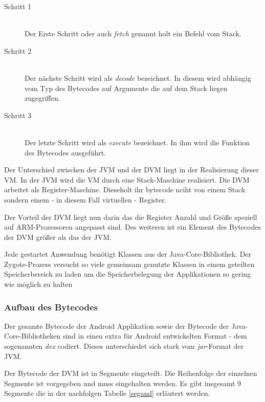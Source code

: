  \begin{description}
 
 \item[Schritt 1] \hfill \\
 
Der Erste Schritt oder auch \textit{fetch} genannt holt ein Befehl vom Stack.
 
 \item[Schritt 2] \hfill \\
Der nächste Schritt wird als \textit{decode} bezeichnet. In diesem wird abhängig vom Typ des Bytecodes auf Argumente die auf dem Stack liegen zugegriffen.
 
 \item[Schritt 3] \hfill \\
 
Der letzte Schritt wird als \textit{execute} bezeichnet. In ihm wird die Funktion des Bytecodes ausgeführt.
 
 \end{description}
 
 Der Unterschied zwischen der JVM und der DVM liegt in der Realisierung dieser VM. In der JVM wird die VM durch eine Stack-Maschine realisiert. Die DVM arbeitet als Register-Maschine. Dieseholt ihr bytecode nciht von einem Stack sondern einem - in diesem Fall virtuellen - Register.
 
 Der Vorteil der DVM liegt nun darin das die Register Anzahl und Größe speziell auf ARM-Prozessoren angepasst sind. Des weiteren ist ein Element des Bytecodes der DVM größer als das der JVM.
 
 Jede gestartet Anwendung benötigt Klassen aus der Java-Core-Bibliothek. Der Zygote-Prozess versucht so viele gemeinsam genutzte Klassen in einem geteilten Speicherbereich zu laden um die Speicherbelegung der Applikationen so gering wie möglich zu halten
 
\subsubsection{Aufbau des Bytecodes}

Der gesamte Bytecode der Android Applikation sowie der Bytecode der Java-Core-Bibliotheken sind in einen extra für Android entwickelten Format - dem sogenannten \textit{dex} codiert. Dieses unterschiedet sich stark vom \textit{jar}-Format der JVM.

Der Bytecode der DVM ist in Segmente eingeteilt. Die Reihenfolge der einzelnen Segmente ist vorgegeben und muss eingehalten werden. Es gibt insgesamt 9 Segmente die in der nachfolgen Tabelle \ref{segand} \cite{eiddvm} erläutert werden.

